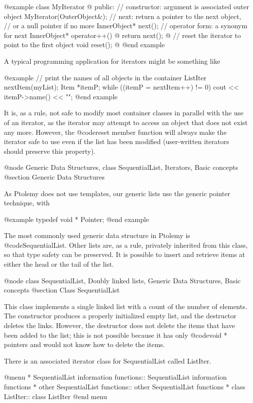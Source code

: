 @example
class MyIterator @{
public:
    // constructor: argument is associated outer object
    MyIterator(OuterObject&);
    // next: return a pointer to the next object,
    // or a null pointer if no more
    InnerObject* next();
    // operator form: a synonym for next
    InnerObject* operator++() @{ return next(); @}
    // reset the iterator to point to the first object
    void reset();
@}
@end example

A typical programming application for iterators might be something like

@example
// print the names of all objects in the container
ListIter nextItem(myList);
Item *itemP;
while ((itemP = nextItem++) != 0)
    cout << itemP->name() << "\n";
@end example

It is, as a rule, not safe to modify most container classes in parallel
with the use of an iterator, as the iterator may attempt to access an
object that does not exist any more.  However, the @code{reset} member
function will always make the iterator safe to use even if the list has
been modified (user-written iterators should preserve this property).

@node Generic Data Structures, class SequentialList, Iterators, Basic concepts
@section Generic Data Structures

As Ptolemy does not use templates, our generic lists use the generic pointer
technique, with

@example
typedef void * Pointer;
@end example

The most commonly used generic data structure in Ptolemy is
@code{SequentialList}.  Other lists are, as a rule, privately inherited
from this class, so that type safety can be preserved.  It is possible
to insert and retrieve items at either the head or the tail of the list.

@node class SequentialList, Doubly linked lists, Generic Data Structures, Basic concepts
@section Class SequentialList

This class implements a single linked list with a count of the number of
elements.  The constructor produces a properly initialized empty list,
and the destructor deletes the links.  However, the destructor does
not delete the items that have been added to the list; this is not
possible because it has only @code{void *} pointers and would not know
how to delete the items.

There is an associated iterator class for SequentialList called ListIter.

@menu
* SequentialList information functions::  SequentialList information functions
* other SequentialList functions::  other SequentialList functions
* class ListIter::              class ListIter
@end menu


